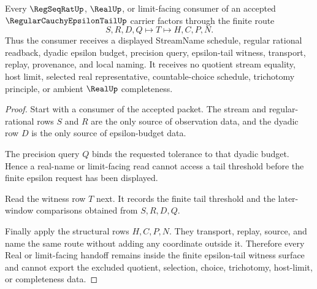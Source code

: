 \begin{theorem}
\label{thm:regular-cauchy-epsilon-tail-real-seal-route}
Every $\RegSeqRatUp$, $\RealUp$, or limit-facing consumer of an accepted $\RegularCauchyEpsilonTailUp$ carrier factors through the finite route
$$
S,R,D,Q \longmapsto T \longmapsto H,C,P,N .
$$
Thus the consumer receives a displayed StreamName schedule, regular rational readback, dyadic epsilon budget, precision query, epsilon-tail witness, transport, replay, provenance, and local naming. It receives no quotient stream equality, host limit, selected real representative, countable-choice schedule, trichotomy principle, or ambient $\RealUp$ completeness.
\end{theorem}
\begin{proof}
Start with a consumer of the accepted packet. The stream and regular-rational rows $S$ and $R$ are the only source of observation data, and the dyadic row $D$ is the only source of epsilon-budget data.

The precision query $Q$ binds the requested tolerance to that dyadic budget. Hence a real-name or limit-facing read cannot access a tail threshold before the finite epsilon request has been displayed.

Read the witness row $T$ next. It records the finite tail threshold and the later-window comparisons obtained from $S,R,D,Q$.

Finally apply the structural rows $H,C,P,N$. They transport, replay, source, and name the same route without adding any coordinate outside it. Therefore every Real or limit-facing handoff remains inside the finite epsilon-tail witness surface and cannot export the excluded quotient, selection, choice, trichotomy, host-limit, or completeness data.
\end{proof}



